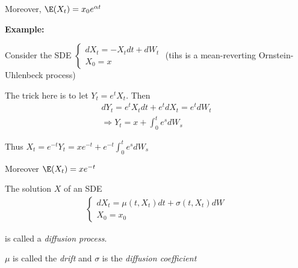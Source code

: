 \noindent Moreover, $\E(X_t) = x_0e^{\alpha t}$
\par\bigskip
\noindent\textbf{Example:}\par
\noindent Consider the SDE $\begin{cases}
  dX_t = -X_tdt + dW_t\\X_0 = x
\end{cases}$ (tihs is a mean-reverting Ornstein-Uhlenbeck process)\par
\noindent The trick here is to let $Y_t = e^tX_t$. Then
\begin{equation*}
  \begin{gathered}
    dY_t = e^tX_tdt + e^tdX_t = e^tdW_t\\
    \Rightarrow Y_t = x+\int_{0}^{t}e^sdW_s
  \end{gathered}
\end{equation*}\par
\noindent Thus $X_t = e^{-t}Y_t = xe^{-t} + e^{-t}\int_{0}^{t}e^sdW_s$\par
\noindent Moreover $\E(X_t) = xe^{-t}$
\par\bigskip
\begin{defo}{}
  The solution $X$ of an SDE
  \begin{equation*}
    \begin{gathered}
      \begin{cases}
        dX_t = \mu(t,X_t)dt + \sigma(t,X_t)dW\\
        X_0 = x_0
      \end{cases}
    \end{gathered}
  \end{equation*}\par
  \noindent is called a \textit{diffusion process}.\par
  \noindent $\mu$ is called the \textit{drift} and $\sigma$ is the \textit{diffusion coefficient}
\end{defo}
\par\bigskip
